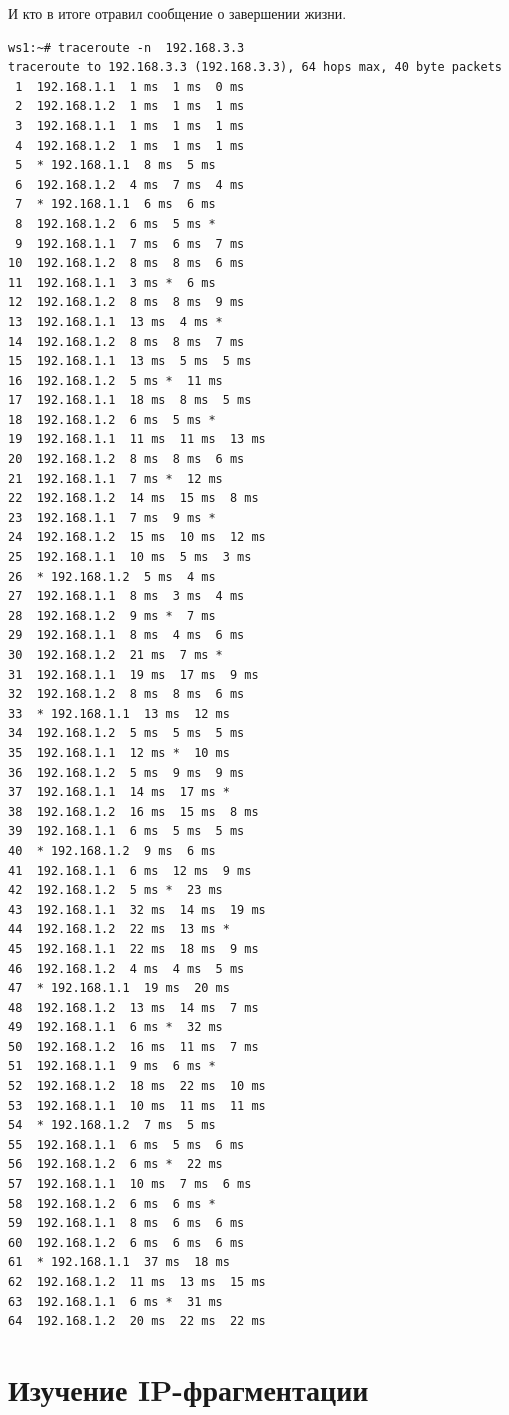 \documentclass[a4paper,12pt]{article}
\begin{document}
И кто в итоге отравил сообщение о завершении жизни.
\begin{Verbatim}
ws1:~# traceroute -n  192.168.3.3
traceroute to 192.168.3.3 (192.168.3.3), 64 hops max, 40 byte packets
 1  192.168.1.1  1 ms  1 ms  0 ms
 2  192.168.1.2  1 ms  1 ms  1 ms
 3  192.168.1.1  1 ms  1 ms  1 ms
 4  192.168.1.2  1 ms  1 ms  1 ms
 5  * 192.168.1.1  8 ms  5 ms
 6  192.168.1.2  4 ms  7 ms  4 ms
 7  * 192.168.1.1  6 ms  6 ms
 8  192.168.1.2  6 ms  5 ms *
 9  192.168.1.1  7 ms  6 ms  7 ms
10  192.168.1.2  8 ms  8 ms  6 ms
11  192.168.1.1  3 ms *  6 ms
12  192.168.1.2  8 ms  8 ms  9 ms
13  192.168.1.1  13 ms  4 ms *
14  192.168.1.2  8 ms  8 ms  7 ms
15  192.168.1.1  13 ms  5 ms  5 ms
16  192.168.1.2  5 ms *  11 ms
17  192.168.1.1  18 ms  8 ms  5 ms
18  192.168.1.2  6 ms  5 ms *
19  192.168.1.1  11 ms  11 ms  13 ms
20  192.168.1.2  8 ms  8 ms  6 ms
21  192.168.1.1  7 ms *  12 ms
22  192.168.1.2  14 ms  15 ms  8 ms
23  192.168.1.1  7 ms  9 ms *
24  192.168.1.2  15 ms  10 ms  12 ms
25  192.168.1.1  10 ms  5 ms  3 ms
26  * 192.168.1.2  5 ms  4 ms
27  192.168.1.1  8 ms  3 ms  4 ms
28  192.168.1.2  9 ms *  7 ms
29  192.168.1.1  8 ms  4 ms  6 ms
30  192.168.1.2  21 ms  7 ms *
31  192.168.1.1  19 ms  17 ms  9 ms
32  192.168.1.2  8 ms  8 ms  6 ms
33  * 192.168.1.1  13 ms  12 ms
34  192.168.1.2  5 ms  5 ms  5 ms
35  192.168.1.1  12 ms *  10 ms
36  192.168.1.2  5 ms  9 ms  9 ms
37  192.168.1.1  14 ms  17 ms *
38  192.168.1.2  16 ms  15 ms  8 ms
39  192.168.1.1  6 ms  5 ms  5 ms
40  * 192.168.1.2  9 ms  6 ms
41  192.168.1.1  6 ms  12 ms  9 ms
42  192.168.1.2  5 ms *  23 ms
43  192.168.1.1  32 ms  14 ms  19 ms
44  192.168.1.2  22 ms  13 ms *
45  192.168.1.1  22 ms  18 ms  9 ms
46  192.168.1.2  4 ms  4 ms  5 ms
47  * 192.168.1.1  19 ms  20 ms
48  192.168.1.2  13 ms  14 ms  7 ms
49  192.168.1.1  6 ms *  32 ms
50  192.168.1.2  16 ms  11 ms  7 ms
51  192.168.1.1  9 ms  6 ms *
52  192.168.1.2  18 ms  22 ms  10 ms
53  192.168.1.1  10 ms  11 ms  11 ms
54  * 192.168.1.2  7 ms  5 ms
55  192.168.1.1  6 ms  5 ms  6 ms
56  192.168.1.2  6 ms *  22 ms
57  192.168.1.1  10 ms  7 ms  6 ms
58  192.168.1.2  6 ms  6 ms *
59  192.168.1.1  8 ms  6 ms  6 ms
60  192.168.1.2  6 ms  6 ms  6 ms
61  * 192.168.1.1  37 ms  18 ms
62  192.168.1.2  11 ms  13 ms  15 ms
63  192.168.1.1  6 ms *  31 ms
64  192.168.1.2  20 ms  22 ms  22 ms
\end{Verbatim}

\section{Изучение IP-фрагментации}
\end{document}
